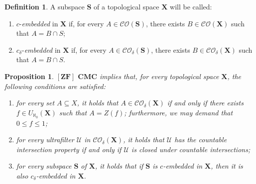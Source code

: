 \documentclass[12pt,twoside,leqno]{article}
\theoremstyle{plain}
\newtheorem{proposition}[theorem]{Proposition}
\theoremstyle{definition}
\newtheorem{definition}[theorem]{Definition}
\theoremstyle{remark}
\begin{document}
\begin{definition}
	\label{s6:d13}
	A subspace $\mathbf{S}$ of a topological space $\mathbf{X}$ will be called:
	\begin{enumerate}
		\item[(i)] $c$-\emph{embedded} in $\mathbf{X}$ if, for every $A\in\mathcal{CO}(\mathbf{S})$, there exists $B\in\mathcal{CO}(\mathbf{X})$ such that $A=B\cap S$;
		\item[(ii)] $c_{\delta}$-\emph{embedded} in $\mathbf{X}$ if, for every $A\in\mathcal{CO}_{\delta}(\mathbf{S})$, there exists $B\in\mathcal{CO}_{\delta}(\mathbf{X})$ such that $A=B\cap S$.
	\end{enumerate}
\end{definition}

\begin{proposition}
	\label{s6:p14}
	$[\mathbf{ZF}]$  $\mathbf{CMC}$ implies that, for every topological space $\mathbf{X}$, the following conditions are satisfied:
	\begin{enumerate}
		\item[(i)] for every set $A\subseteq X$, it holds that $A\in\mathcal{CO}_{\delta}(\mathbf{X})$ if and only if there exists $f\in U_{\aleph_0}(\mathbf{X})$ such that $A=Z(f)$; furthermore, we may demand that $0\leq f\leq 1$;  
		\item[(ii)]  for every ultrafilter $\mathcal{U}$ in $\mathcal{CO}_{\delta}(\mathbf{X})$, it holds that $\mathcal{U}$ has the countable intersection property if and only if $\mathcal{U}$ is closed under countable intersections; 
		\item[(iii)]   for every subspace $\mathbf{S}$ of $\mathbf{X}$, it holds that if $\mathbf{S}$ is $c$-embedded in $\mathbf{X}$, then it is also $c_{\delta}$-embedded in $\mathbf{X}$.
	\end{enumerate}
\end{proposition} 
\end{document}
